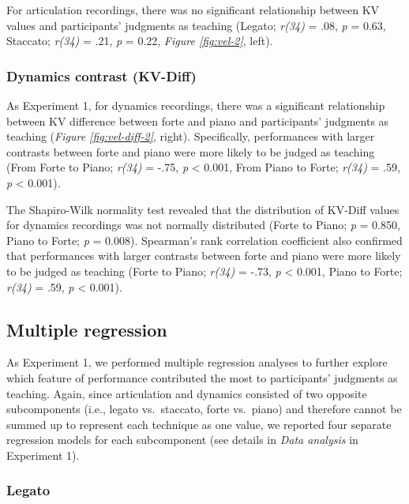 \documentclass[
  man,floatsintext]{apa6}
\begin{document}
For articulation recordings, there was no significant relationship between KV values and participants' judgments as teaching (Legato; \emph{r(34)} = .08, \emph{p} = 0.63, Staccato; \emph{r(34)} = .21, \emph{p} = 0.22, \emph{Figure \ref{fig:vel-2}}, left).

\hypertarget{dynamics-contrast-kv-diff-1}{%
\subsubsection{Dynamics contrast (KV-Diff)}\label{dynamics-contrast-kv-diff-1}}

As Experiment 1, for dynamics recordings, there was a significant relationship between KV difference between forte and piano and participants' judgments as teaching (\emph{Figure \ref{fig:vel-diff-2}}, right). Specifically, performances with larger contrasts between forte and piano were more likely to be judged as teaching (From Forte to Piano; \emph{r(34)} = -.75, \emph{p} \textless{} 0.001, From Piano to Forte; \emph{r(34)} = .59, \emph{p} \textless{} 0.001).

The Shapiro-Wilk normality test revealed that the distribution of KV-Diff values for dynamics recordings was not normally distributed (Forte to Piano; \emph{p} = 0.850, Piano to Forte; \emph{p} = 0.008). Spearman's rank correlation coefficient also confirmed that performances with larger contrasts between forte and piano were more likely to be judged as teaching (Forte to Piano; \emph{r(34)} = -.73, \emph{p} \textless{} 0.001, Piano to Forte; \emph{r(34)} = .59, \emph{p} \textless{} 0.001).

\hypertarget{multiple-regression-1}{%
\subsection{Multiple regression}\label{multiple-regression-1}}

As Experiment 1, we performed multiple regression analyses to further explore which feature of performance contributed the most to participants' judgments as teaching. Again, since articulation and dynamics consisted of two opposite subcomponents (i.e., legato vs.~staccato, forte vs.~piano) and therefore cannot be summed up to represent each technique as one value, we reported four separate regression models for each subcomponent (see details in \emph{Data analysis} in Experiment 1).

\hypertarget{legato-1}{%
\subsubsection{Legato}\label{legato-1}}
\end{document}

